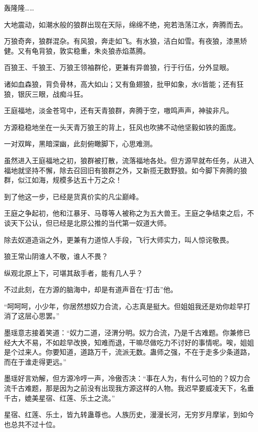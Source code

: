 
\begin{this_body}

轰隆隆……

大地震动，如潮水般的狼群出现在天际，绵绵不绝，宛若浩荡江水，奔腾而去。

万狼奇奔，狼群混杂。有风狼，奔走如飞。有水狼，洁白如雪。有夜狼，漆黑矫健。又有龟背狼，敦实稳重，朱炎狼赤焰蒸腾。

百狼王、千狼王、万狼王领袖群伦，更兼有异兽狼，行于行伍，分外显眼。

诸如血森狼，背负骨林，高大如山；又有鱼翅狼，批甲如象，水6皆能；还有狂狼，银灰三眼，战痴斗狂。

王庭福地，淡金苍穹中，还有天青狼群，奔腾于空，嗷鸣声声，神骏非凡。

方源稳稳地坐在一头天青万狼王的背上，狂风也吹拂不动他坚毅如铁的面庞。

一对双眸，黑暗深幽，此刻俯瞰脚下，心思难测。

虽然进入王庭福地之初，狼群被打散，流落福地各处。但方源早就布任务，从进入福地就坚持不懈，除去召回旧有狼群之外，又新揽无数野狼。如今脚下奔腾的狼群，似江如海，规模多达五十万之众！

到了他这一步，已经是货真价实的凡尘巅峰。

王庭之争起初，他和江暴牙、马尊等人被称之为五大兽王。王庭之争结束之后，不谈天下公认，但已经是北原公推的当代第一奴道大师。

除去奴道造诣之外，更兼有力道惊人手段，飞行大师实力，叫人惊诧敬畏。

狼王常山阴谁人不敬，谁人不畏？

纵观北原上下，可堪其敌手者，能有几人乎？

不过此刻，在方源的脑海中，却是有道声音在“打击”他。

“呵呵呵，小少年，你居然想奴力合流，心志真是挺大。但姐姐我还是劝你趁早打消了这层心思罢。”

墨瑶意志接着笑道：“奴力二道，泾渭分明。奴力合流，乃是千古难题。你兼修已经大大不易，不如趁早改换，知难而退，干嘛尽做吃力不讨好的事情呢。唉，姐姐是个过来人。你要知道，道路万千，流派无数。蛊师之强，不在于走多少条道路，而在于谁走得更远。”

墨瑶好言劝解，但方源冷哼一声，冷傲否决：“事在人为，有什么可怕的？奴力合流千古难题，那是因为之前没有出现我方源这样的人物。我迟早要威凌天下，名垂千古，媲美星宿、红莲、乐土之流。”

星宿、红莲、乐土，皆九转蛊尊也。人族历史，漫漫长河，无穷岁月摩挲，到如今也总共不过十位。


\end{this_body}
